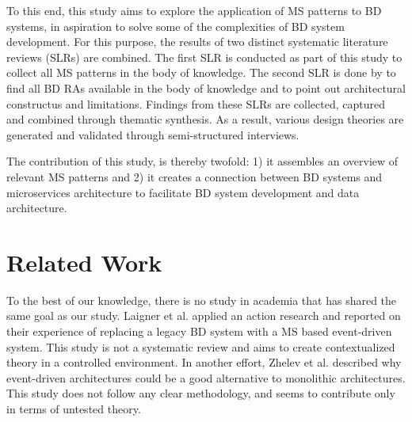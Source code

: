 \documentclass{bmcart}
\begin{document}
To this end, this study aims to explore the application of MS patterns to BD systems, in aspiration to solve some of the complexities of BD system development. For this purpose, the results of two distinct systematic literature reviews (SLRs) are combined. The first SLR is conducted as part of this study to collect all MS patterns in the body of knowledge. The second SLR is done by \cite{ataei2022state} to find all BD RAs available in the body of knowledge and to point out architectural constructus and limitations. Findings from these SLRs are collected, captured and combined through thematic synthesis. As a result, various design theories are generated and validated through semi-structured interviews.  



The contribution of this study, is thereby twofold: 1) it assembles an overview of relevant MS patterns and 2) it creates a connection between BD systems and microservices architecture to facilitate BD system development and data architecture.


\section{Related Work}

To the best of our knowledge, there is no study in academia that has shared the same goal as our study. Laigner et al. \cite{laigner2020monolithic} applied an action research and reported on their experience of replacing a legacy BD system with a MS based event-driven system. This study is not a systematic review and aims to create contextualized theory in a controlled environment. In another effort,  Zhelev et al. \cite{zhelev2019using} described why event-driven architectures could be a good alternative to monolithic architectures. This study does not follow any clear methodology, and seems to contribute only in terms of untested theory.
\end{document}
